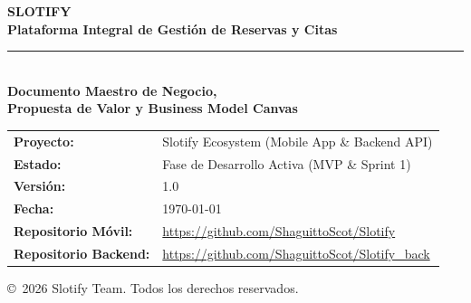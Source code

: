 \documentclass[11pt,a4paper]{article}
\begin{document}
\begin{titlepage}
    \pagecolor{lightGray}

    \vspace*{2.0cm}
    \begin{flushleft}
        \hspace*{1.2cm}
        \begin{minipage}{0.88\textwidth}
            {\Huge\textbf{\color{primaryDark} SLOTIFY}}\\[0.4cm]
            {\Large\textbf{\color{primaryBlue} Plataforma Integral de Gestión de Reservas y Citas}}\\[0.2cm]
            {\color{textMuted}\rule{\linewidth}{1.5pt}}\\[0.6cm]
            {\LARGE\textbf{\color{textDark} Documento Maestro de Negocio,}}\\[0.2cm]
            {\LARGE\textbf{\color{textDark} Propuesta de Valor y Business Model Canvas}}\\[2.0cm]
            
            \begin{tabular}{ll}
                \textbf{\color{primaryDark} Proyecto:} & Slotify Ecosystem (Mobile App \& Backend API) \\[4pt]
                \textbf{\color{primaryDark} Estado:} & Fase de Desarrollo Activa (MVP \& Sprint 1) \\[4pt]
                \textbf{\color{primaryDark} Versión:} & 1.0 \\[4pt]
                \textbf{\color{primaryDark} Fecha:} & \today \\[4pt]
                \textbf{\color{primaryDark} Repositorio Móvil:} & \url{https://github.com/ShaguittoScot/Slotify} \\[4pt]
                \textbf{\color{primaryDark} Repositorio Backend:} & \url{https://github.com/ShaguittoScot/Slotify_back} \\
            \end{tabular}
            
            \vfill
            \vspace{2.5cm}
            {\footnotesize\color{textMuted} \copyright\ 2026 Slotify Team. Todos los derechos reservados.}
        \end{minipage}
    \end{flushleft}
\end{titlepage}
\end{document}
